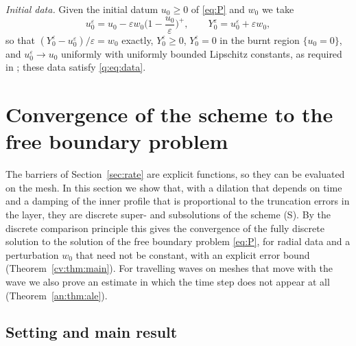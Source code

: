 \documentclass[11pt]{amsart}
\theoremstyle{definition}
\theoremstyle{remark}
\newcommand{\ve}{\varepsilon}
\begin{document}
\emph{Initial data.} Given the initial datum $u_0\ge0$ of \eqref{eq:P} and $w_0$ we take
\begin{equation}\label{eq:initdata}
u_0^\ve=u_0-\ve w_0\Big(1-\frac{u_0}\ve\Big)^+,\qquad Y_0^\ve=u_0^\ve+\ve w_0,
\end{equation}
so that $(Y_0^\ve-u_0^\ve)/\ve=w_0$ exactly, $Y_0^\ve\ge0$, $Y_0^\ve=0$ in the burnt region
$\{u_0=0\}$, and $u_0^\ve\to u_0$ uniformly with uniformly bounded Lipschitz constants, as
required in \cite{FernandezBonderWolanski2004}; these data satisfy \eqref{q:eq:data}.

\section{Convergence of the scheme to the free boundary problem}\label{sec:analysis}

The barriers of Section~\ref{sec:rate} are explicit functions, so they can be
evaluated on the mesh. In this section we show that, with a dilation that depends on
time and a damping of the inner profile that is proportional to the truncation errors
in the layer, they are discrete super- and subsolutions of the scheme (S). By the
discrete comparison principle this gives the convergence of the fully discrete solution
to the solution of the free boundary problem \eqref{eq:P}, for radial data and a
perturbation $w_0$ that need not be constant, with
an explicit error bound (Theorem~\ref{cv:thm:main}). For
travelling waves on meshes that move with the wave we also prove an estimate in which
the time step does not appear at all (Theorem~\ref{an:thm:ale}).

\subsection{Setting and main result}\label{cv:sec:main}
\end{document}
